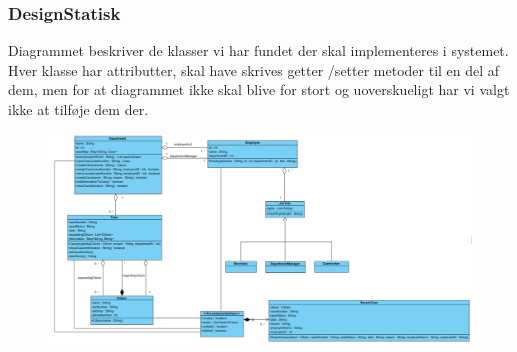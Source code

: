 \subsubsection{DesignStatisk}
Diagrammet beskriver de klasser vi har fundet der skal implementeres i systemet. Hver klasse har attributter, skal have skrives getter /setter metoder til en del af dem, men for at diagrammet ikke skal blive for stort og uoverskueligt har vi valgt ikke at tilføje dem der.\\
\begin{figure}[h]
\includegraphics[width = \linewidth]{./PNG/designklassediagram.PNG}
\end{figure}